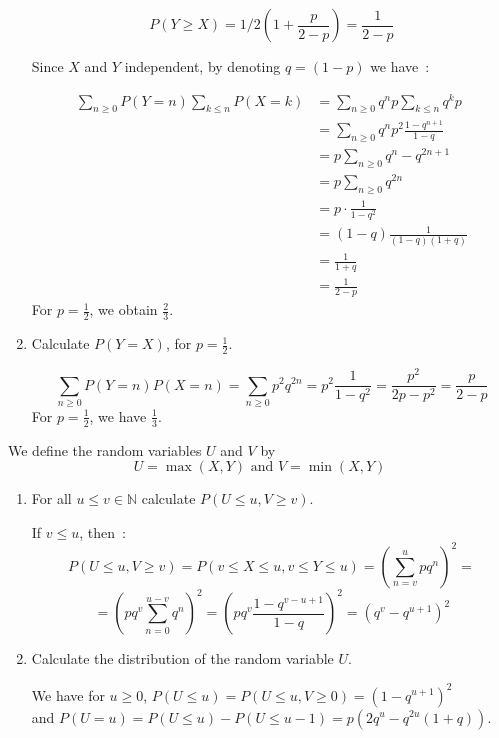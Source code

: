 \documentclass[a4paper,11pt]{exam}
\begin{document}
\begin{questions}
\begin{enumerate}
\begin{solution}
		\[
		P(Y \geq X) =  1/2(1 +\frac{p}{2-p}) = \frac{1}{2-p} 
		\]
		
		
		
		Since $X$ and $Y$ independent, by denoting $q=(1-p)$ we have~:
		
		\begin{align*}
		\sum_{n \geq 0} P(Y=n) \sum_{k \leq n} P(X=k)
		&= \sum_{n \geq 0} q^n p \sum_{k \leq n} q^k p \\
		&= \sum_{n \geq 0} q^n p^2 \frac{1-q^{n+1}}{1-q} \\
		&= p \sum_{n \geq 0} q^n -q^{2n+1} \\
		&= p \sum_{n \geq 0} q^{2n} \\
		&= p \cdot \frac{1}{1-q^2} \\
		&= (1-q) \frac{1}{(1-q)(1+q)} \\
		&= \frac{1}{1+q} \\
		&= \frac{1}{2-p}
		\end{align*}
		For $p=\frac{1}{2}$, we obtain $\frac{2}{3}$.
	\end{solution}
		
	\item Calculate $P(Y = X)$, for $p=\frac{1}{2}$.
	
	\begin{solution}
		\[
		\sum_{n \geq 0} P(Y=n) P(X=n)
		= \sum_{n \geq 0} p^2 q^{2n}
		= p^2 \frac{1}{1-q^2}
		= \frac{p^2}{2p-p^2}
		= \frac{p}{2-p}
		\]
		For $p=\frac{1}{2}$, we have $\frac{1}{3}$.
	\end{solution}
	
	
	

\end{enumerate}
We define the random variables $U$ and $V$ by
\[
U = \max(X,Y) \mbox{ and } V = \min(X,Y)
\]
\begin{enumerate}[resume]
	\item For all $u\leq v\in \mathbb N$ calculate $P(U\leq u,V\geq v)$.
	
	\begin{solution}
		If $v \leq u$, then~:
		\[
		P(U\leq u,V\geq v)
		= P( v \leq X \leq u, v\leq Y \leq u)
		=\left(\sum_{n=v}^{u}pq^n \right)^2 =
		\]
		\[
		=\left(pq^v\sum_{n=0}^{u-v}q^n \right)^2
		=\left(pq^v\frac{1-q^{v-u+1}}{1-q} \right)^2
		= (q^{v} -q^{u+1})^2
		\]
	\end{solution}
	
	\item Calculate the distribution of the random variable $U$.
	
	\begin{solution}
		We have for $u\geq 0$,
		$P(U\leq u ) = P(U\leq u , V \geq 0) = (1 -q^{u+1})^2$\\
		and $P(U=u) = P(U\leq u) - P(U \leq u-1) = p(2q^u-q^{2u}(1+q))$.
	\end{solution}
	

\end{enumerate}
\end{questions}
\end{document}
